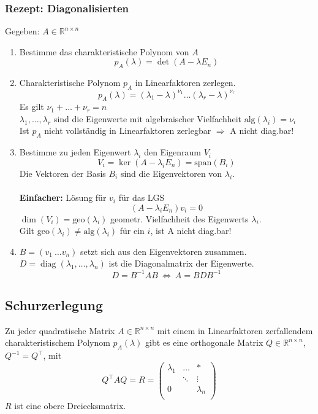 \documentclass[6pt,a4paper]{scrartcl}
\DeclareMathOperator{\diag}{diag}
\begin{document}
\begin{multicols*}{4}
\subsubsection{Rezept: Diagonalisierten}
Gegeben: $A\in \mathbb{R}^{n\times n}$
\begin{enumerate}
\item Bestimme das charakteristische Polynom von $A$
\begin{equation*}
p_A(\lambda)=\det(A-\lambda E_n)
\end{equation*}
\item Charakteristische Polynom $p_A$ in Linearfaktoren zerlegen.
\begin{equation*}
p_A(\lambda)=(\lambda_1-\lambda)^{\nu_1}\dots(\lambda_r-\lambda)^{\nu_r}
\end{equation*}
Es gilt $\nu_1 + \dots + \nu_r=n$ \\
$\lambda_1,\dots, \lambda_r$ sind die Eigenwerte mit algebraischer Vielfachheit $\text{alg}(\lambda_i)=\nu_i$\\
Ist $p_A$ nicht vollständig in Linearfaktoren zerlegbar $\Rightarrow$ A nicht diag.bar!
\item Bestimme zu jeden Eigenwert $\lambda_i$ den Eigenraum $V_i$
\begin{equation*}
V_i=\ker(A-\lambda_iE_n)=\text{span}(B_i)
\end{equation*}
Die Vektoren der Basis $B_i$ sind die Eigenvektoren von $\lambda_i$.\\ \\
\textbf{Einfacher:} Lösung für $v_i$ für das LGS
\begin{equation*}
(A-\lambda_i E_n)v_i=0
\end{equation*}
$\dim(V_i)=\text{geo}(\lambda_i)$  geometr. Vielfachheit des Eigenwerts $\lambda_i$. \\
Gilt geo$(\lambda_i)\ne\text{alg}(\lambda_i)$ für ein $i$, ist A nicht diag.bar!
\item $B=(v_1 \ \dots v_n)$ setzt sich aus den Eigenvektoren zusammen. \\
$D=\diag(\lambda_1,\dots,\lambda_n)$ ist die Diagonalmatrix der Eigenwerte.
\begin{equation*}
D=B^{-1}AB \ \Leftrightarrow \ A=BDB^{-1}
\end{equation*}
\end{enumerate}
\subsection{Schurzerlegung}
Zu jeder quadratische Matrix $A\in \mathbb{R}^{n\times n}$ mit einem in Linearfaktoren zerfallendem charakteristischem Polynom $p_A(\lambda)$ gibt es eine orthogonale Matrix $Q\in \mathbb{R}^{n\times n}$, $Q^{-1}=Q^\top$, mit
\begin{equation*}
Q^\top AQ=R=\begin{pmatrix}
\lambda_1 & \dots & \ast \\
 & \ddots & \vdots \\
0 &  & \lambda_n \\
\end{pmatrix}
\end{equation*}
$R$ ist eine obere Dreiecksmatrix.

\end{multicols*}
\end{document}
